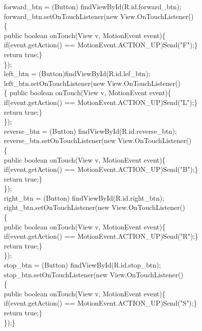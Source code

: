 \documentclass[12pt,a4paper]{report}
\begin{document}
{{{        forward\_btn = (Button) findViewById(R.id.forward\_btn);\\
        forward\_btn.setOnTouchListener(new View.OnTouchListener()\\
        \{   \@Override\\
        public boolean onTouch(View v, MotionEvent event)\{\\
            if(event.getAction() == MotionEvent.ACTION\_UP){Send("F");\}\\
            return true;\}\\
        \});\\
        left\_btn =  (Button)findViewById(R.id.lef\_btn);\\
        left\_btn.setOnTouchListener(new View.OnTouchListener()\\
        \{   \@Override
        public boolean onTouch(View v, MotionEvent event)\{\\
            if(event.getAction() == MotionEvent.ACTION\_UP){Send("L");\}\\
            return true;\}\\
       \});\\
        reverse\_btn = (Button) findViewById(R.id.reverse\_btn);
        reverse\_btn.setOnTouchListener(new View.OnTouchListener()\\
        \{   \@Override\\
        public boolean onTouch(View v, MotionEvent event)\{\\
            if(event.getAction() == MotionEvent.ACTION\_UP){Send("B");\}\\
            return true;\}\\
        \});\\
        right\_btn = (Button) findViewById(R.id.right\_btn);\\
        right\_btn.setOnTouchListener(new View.OnTouchListener()\\
       \{   \@Override\\
        public boolean onTouch(View v, MotionEvent event)\{\\
            if(event.getAction() == MotionEvent.ACTION\_UP){Send("R");\}\\
            return true;\}\\
        \});\\
        stop\_btn = (Button) findViewById(R.id.stop\_btn);\\
        stop\_btn.setOnTouchListener(new View.OnTouchListener()\\
        \{   \@Override\\
        public boolean onTouch(View v, MotionEvent event)\{\\
            if(event.getAction() == MotionEvent.ACTION\_UP){Send("S");\}\\
            return true;\}\\
        \});\}\\

}}}}}}}}
\end{document}
